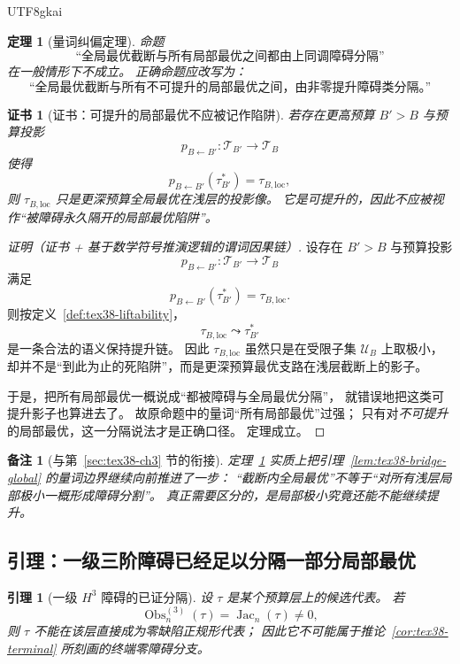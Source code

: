 \documentclass[12pt]{article}
\newtheorem{theorem}{定理}[section]
\newtheorem{lemma}{引理}[section]
\newtheorem{remark}{备注}[section]
\newtheorem{Certificate}{证书}[section]
\newcommand{\Jac}{\operatorname{Jac}}
\newcommand{\Obs}{\operatorname{Obs}}
\begin{document}
\begin{CJK*}{UTF8}{gkai}
\begin{theorem}[量词纠偏定理]
\label{thm:tex38-quantifier-correction}
命题
\[
  \text{“全局最优截断与所有局部最优之间都由上同调障碍分隔”}
\]
在一般情形下不成立。
正确命题应改写为：
\[
  \text{“全局最优截断与所有不可提升的局部最优之间，由非零提升障碍类分隔。”}
\]
\end{theorem}

\begin{Certificate}[证书：可提升的局部最优不应被记作陷阱]
\label{cert:tex38-quantifier-correction}
若存在更高预算 $B'>B$ 与预算投影
\[
  p_{B\leftarrow B'}:\mathcal T_{B'}\to\mathcal T_B
\]
使得
\[
  p_{B\leftarrow B'}(\tau_{B'}^\ast)=\tau_{B,\mathrm{loc}},
\]
则 $\tau_{B,\mathrm{loc}}$ 只是更深预算全局最优在浅层的投影像。
它是可提升的，因此不应被视作“被障碍永久隔开的局部最优陷阱”。
\end{Certificate}

\begin{proof}[证明（证书 + 基于数学符号推演逻辑的谓词因果链）]
设存在 $B'>B$ 与预算投影
\[
  p_{B\leftarrow B'}:\mathcal T_{B'}\to\mathcal T_B
\]
满足
\[
  p_{B\leftarrow B'}(\tau_{B'}^\ast)=\tau_{B,\mathrm{loc}}.
\]
则按定义~\ref{def:tex38-liftability}，
\[
  \tau_{B,\mathrm{loc}}
  \leadsto
  \tau_{B'}^\ast
\]
是一条合法的语义保持提升链。
因此 $\tau_{B,\mathrm{loc}}$ 虽然只是在受限子集 $\mathcal U_B$ 上取极小，
却并不是“到此为止的死陷阱”，而是更深预算最优支路在浅层截断上的影子。

于是，把所有局部最优一概说成“都被障碍与全局最优分隔”，
就错误地把这类可提升影子也算进去了。
故原命题中的量词“所有局部最优”过强；
只有对\emph{不可提升}的局部最优，这一分隔说法才是正确口径。
定理成立。
\end{proof}

\begin{remark}[与第~\ref{sec:tex38-ch3} 节的衔接]
定理~\ref{thm:tex38-quantifier-correction} 实质上把引理~\ref{lem:tex38-bridge-global} 的量词边界继续向前推进了一步：
“截断内全局最优”不等于“对所有浅层局部极小一概形成障碍分割”。
真正需要区分的，是局部极小究竟还能不能继续提升。
\end{remark}

\subsection{引理：一级三阶障碍已经足以分隔一部分局部最优}
\label{subsec:tex38-first-obstruction}

\begin{lemma}[一级 $H^3$ 障碍的已证分隔]
\label{lem:tex38-first-obstruction}
设 $\tau$ 是某个预算层上的候选代表。
若
\[
  \Obs^{(3)}_n(\tau)=\Jac_n(\tau)\neq 0,
\]
则 $\tau$ 不能在该层直接成为零缺陷正规形代表；
因此它不可能属于推论~\ref{cor:tex38-terminal} 所刻画的终端零障碍分支。
\end{lemma}


\end{CJK*}
\end{document}
